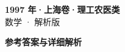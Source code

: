 \documentclass[zihao=-4, a4paper]{ctexart}
\begin{document}
\begin{center}
  {\Large\bfseries 1997 年·上海卷·理工农医类}\\[4pt]
  {\large 数学 · 解析版}
\end{center}
\medskip
{}

\clearpage
{}
\begin{center}{\Large\bfseries 参考答案与详细解析}\end{center}
\medskip

\end{document}

